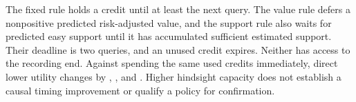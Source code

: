 The fixed rule holds a credit until at least the next query.
The value rule defers a nonpositive predicted risk-adjusted
value, and the support rule also waits for predicted easy
support until it has accumulated sufficient estimated
support. Their deadline is two queries, and an unused
credit expires. Neither has access to the recording end.
Against spending the same used credits immediately, direct
lower utility changes by \NeuralCreditFixedEffect{},
\NeuralCreditValueEffect{}, and \NeuralCreditSupportEffect{}.
Higher hindsight capacity does not establish a causal
timing improvement or qualify a policy for confirmation.
